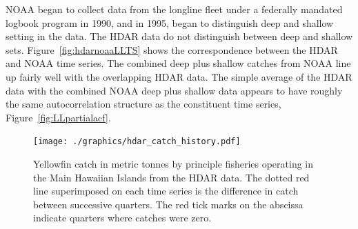 \documentclass[12pt,letterpaper]{article}
\newcommand\help[1]{\color{Magenta}{\it #1 }\normalcolor}
\begin{document}
NOAA began to collect data from the longline fleet under a federally
mandated logbook program in 1990, and in 1995, began to distinguish
deep and shallow setting in the data. The HDAR data do not
distinguish between deep and shallow sets.
Figure~\ref{fig:hdarnoaaLLTS} shows the correspondence between the
HDAR and NOAA time series. The combined deep plus shallow catches from
NOAA line up fairly well with the overlapping HDAR data. The simple
average of the HDAR data with the combined NOAA deep plus shallow data
appears to have roughly the same autocorrelation structure as the
constituent time series, Figure~\ref{fig:LLpartialacf}.
\help{Data are also available from NOAA for the period 1990-1995, but
have not yet been included in this analysis.}


\begin{figure}
\begin{center}
\texttt{[image: ./graphics/hdar\_catch\_history.pdf]}
\caption{\label{fig:hdarTS}
Yellowfin catch in metric tonnes by principle fisheries operating in
the Main Hawaiian Islands from the HDAR data.
The dotted red line superimposed on each time series is the difference in
catch between successive quarters.
The red tick marks on the abscissa indicate quarters where catches
were zero.
}
\end{center}
\end{figure}
\end{document}
